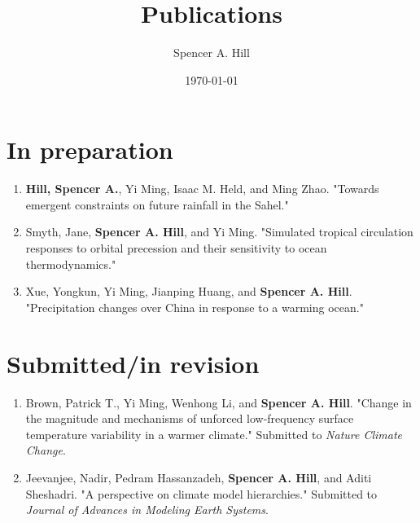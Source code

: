 \documentclass[12pt,letterpaper]{shillcv}
\author{Spencer A. Hill}
\date{\today}
\title{Publications}
\begin{document}
\maketitle
\section*{In preparation}
\label{sec:org893034f}
\begin{enumerate}
\item \textbf{Hill, Spencer A.}, Yi Ming, Isaac M. Held, and Ming Zhao.  "Towards emergent
constraints on future rainfall in the Sahel."
\item Smyth, Jane, \textbf{Spencer A. Hill}, and Yi Ming.  "Simulated tropical circulation
responses to orbital precession and their sensitivity to ocean thermodynamics."
\item Xue, Yongkun, Yi Ming, Jianping Huang, and \textbf{Spencer A. Hill}.  "Precipitation
changes over China in response to a warming ocean."
\end{enumerate}
\section*{Submitted/in revision}
\label{sec:orgc538a12}
\begin{enumerate}
\item Brown, Patrick T., Yi Ming, Wenhong Li, and \textbf{Spencer A. Hill}.  "Change in the
magnitude and mechanisms of unforced low-frequency surface temperature
variability in a warmer climate."  Submitted to \emph{Nature Climate Change}.
\item Jeevanjee, Nadir, Pedram Hassanzadeh, \textbf{Spencer A. Hill}, and Aditi Sheshadri.
"A perspective on climate model hierarchies."  Submitted to \emph{Journal of
Advances in Modeling Earth Systems}.
\end{enumerate}
\end{document}
